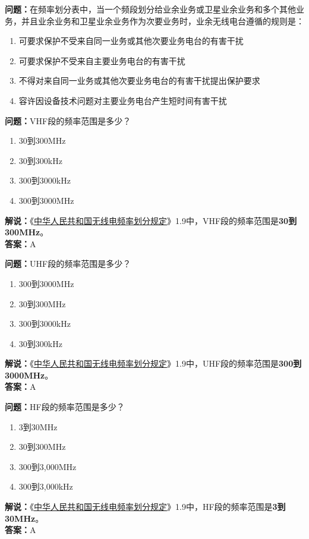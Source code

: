 \textbf{问题：}在频率划分表中，当一个频段划分给业余业务或卫星业余业务和多个其他业务，并且业余业务和卫星业余业务作为次要业务时，业余无线电台遵循的规则是：
\begin{enumerate}[label=\Alph*), leftmargin=1.5cm]
	\item 可要求保护不受来自同一业务或其他次要业务电台的有害干扰
	\item 可要求保护不受来自主要业务电台的有害干扰
	\item 不得对来自同一业务或其他次要业务电台的有害干扰提出保护要求
	\item 容许因设备技术问题对主要业务电台产生短时间有害干扰
\end{enumerate}

\textbf{问题：}VHF段的频率范围是多少？
\begin{enumerate}[label=\Alph*), leftmargin=1.5cm]
	\item 30到300MHz
	\item 30到300kHz
	\item 300到3000kHz
	\item 300到3000MHz
\end{enumerate}
\textbf{解说：}《\href{https://www.miit.gov.cn/zwgk/zcwj/wjfb/txy/art/2020/art_066386284cd2449493586c81ccafed11.html}{中华人民共和国无线电频率划分规定}》1.9中，VHF段的频率范围是\textbf{30到300MHz}。\\\textbf{答案：}A

\textbf{问题：}UHF段的频率范围是多少？
\begin{enumerate}[label=\Alph*), leftmargin=1.5cm]
	\item 300到3000MHz
	\item 30到300MHz
	\item 300到3000kHz
	\item 30到300kHz
\end{enumerate}
\textbf{解说：}《\href{https://www.miit.gov.cn/zwgk/zcwj/wjfb/txy/art/2020/art_066386284cd2449493586c81ccafed11.html}{中华人民共和国无线电频率划分规定}》1.9中，UHF段的频率范围是\textbf{300到3000MHz}。\\\textbf{答案：}A

\textbf{问题：}HF段的频率范围是多少？
\begin{enumerate}[label=\Alph*), leftmargin=1.5cm]
	\item 3到30MHz
	\item 30到300MHz
	\item 300到3,000MHz
	\item 300到3,000kHz
\end{enumerate}
\textbf{解说：}《\href{https://www.miit.gov.cn/zwgk/zcwj/wjfb/txy/art/2020/art_066386284cd2449493586c81ccafed11.html}{中华人民共和国无线电频率划分规定}》1.9中，HF段的频率范围是\textbf{3到30MHz}。\\\textbf{答案：}A

